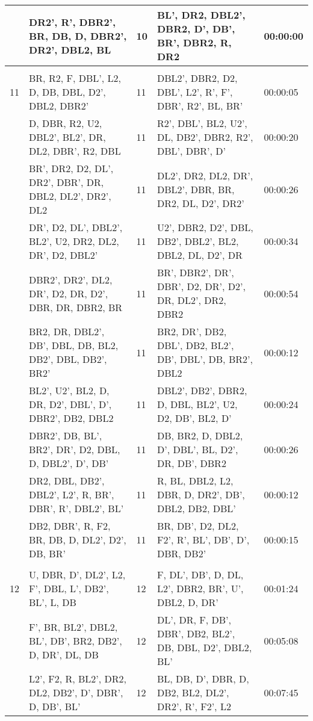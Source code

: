 \begin{table}[h]
{\begin{tabular}{|p{2cm}|p{7cm}|p{2cm}|p{7cm}|p{2.8cm}|}
 & DR2', R', DBR2', BR, DB, D,   DBR2', DR2', DBL2, BL & 10 & BL', DR2, DBL2', DBR2, D', DB',   BR', DBR2, R, DR2 & 00:00:00 \\ \hline
 &  &  &  &  \\ \hline
11 & BR, R2, F, DBL', L2, D, DB, DBL,   D2', DBL2, DBR2' & 11 & DBL2', DBR2, D2, DBL', L2', R',   F', DBR', R2', BL, BR' & 00:00:05 \\ \hline
 & D, DBR, R2, U2, DBL2', BL2', DR,   DL2, DBR', R2, DBL & 11 & R2', DBL', BL2, U2', DL, DB2',   DBR2, R2', DBL', DBR', D' & 00:00:20 \\ \hline
 & BR', DR2, D2, DL', DR2', DBR',   DR, DBL2, DL2', DR2', DL2 & 11 & DL2', DR2, DL2, DR', DBL2', DBR,   BR, DR2, DL, D2', DR2' & 00:00:26 \\ \hline
 & DR', D2, DL', DBL2', BL2', U2,   DR2, DL2, DR', D2, DBL2' & 11 & U2', DBR2, D2', DBL, DB2',   DBL2', BL2, DBL2, DL, D2', DR & 00:00:34 \\ \hline
 & DBR2', DR2', DL2, DR', D2, DR,   D2', DBR, DR, DBR2, BR & 11 & BR', DBR2', DR', DBR', D2, DR',   D2', DR, DL2', DR2, DBR2 & 00:00:54 \\ \hline
 & BR2, DR, DBL2', DB', DBL, DB,   BL2, DB2', DBL, DB2', BR2' & 11 & BR2, DR', DB2, DBL', DB2, BL2',   DB', DBL', DB, BR2', DBL2 & 00:00:12 \\ \hline
 & BL2', U2', BL2, D, DR, D2',   DBL', D', DBR2', DB2, DBL2 & 11 & DBL2', DB2', DBR2, D, DBL, BL2',   U2, D2, DB', BL2, D' & 00:00:24 \\ \hline
 & DBR2', DB, BL', BR2', DR', D2,   DBL, D, DBL2', D', DB' & 11 & DB, BR2, D, DBL2, D', DBL', BL,   D2', DR, DB', DBR2 & 00:00:26 \\ \hline
 & DR2, DBL, DB2', DBL2', L2', R,   BR', DBR', R', DBL2', BL' & 11 & R, BL, DBL2, L2, DBR, D, DR2',   DB', DBL2, DB2, DBL' & 00:00:12 \\ \hline
 & DB2, DBR', R, F2, BR, DB, D,   DL2', D2', DB, BR' & 11 & BR, DB', D2, DL2, F2', R', BL',   DB', D', DBR, DB2' & 00:00:15 \\ \hline
 &  &  &  &  \\ \hline
12 & U, DBR, D', DL2', L2, F', DBL,   L', DB2', BL', L, DB & 12 & F, DL', DB', D, DL, L2', DBR2,   BR', U', DBL2, D, DR' & 00:01:24 \\ \hline
 & F', BR, BL2', DBL2, BL', DB',   BR2, DB2', D, DR', DL, DB & 12 & DL', DR, F, DB', DBR', DB2,   BL2', DB, DBL, D2', DBL2, BL' & 00:05:08 \\ \hline
 & L2', F2, R, BL2', DR2, DL2,   DB2', D', DBR', D, DB', BL' & 12 & BL, DB, D', DBR, D, DB2, BL2,   DL2', DR2', R', F2', L2 & 00:07:45 \\ \hline

\end{tabular}}
\end{table}
